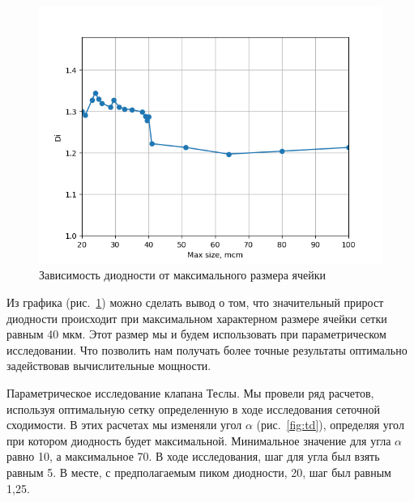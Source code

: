\documentclass[14pt,a4paper]{article}
\begin{document}
                            
         
         \begin{figure}[H]
             \centering
             \includegraphics[width = 1\linewidth]{graphDiMaxSize}
             \caption{Зависимость диодности от максимального размера ячейки}
             \label{fig:graphDiMaxSize}
         \end{figure}
         
         Из графика (рис.~\ref{fig:graphDiMaxSize}) можно сделать вывод о том, что значительный прирост диодности происходит при максимальном характерном размере ячейки сетки равным 40 мкм. Этот размер мы и будем использовать при параметрическом исследовании. Что позволить нам получать более точные результаты оптимально задействовав вычислительные мощности. 
         
         
         Параметрическое исследование клапана Теслы. Мы провели ряд расчетов, используя оптимальную сетку определенную в ходе исследования сеточной сходимости. В этих расчетах мы изменяли угол $ \alpha $ (рис.~\ref{fig:td}), определяя угол при котором диодность будет максимальной. Минимальное значение для угла $ \alpha $ равно 10\textdegree, а максимальное 70\textdegree. В ходе исследования, шаг для угла был взять равным 5\textdegree. В месте, с предполагаемым пиком диодности, 20\textdegree, шаг был равным 1,25\textdegree. 
         
\end{document}
